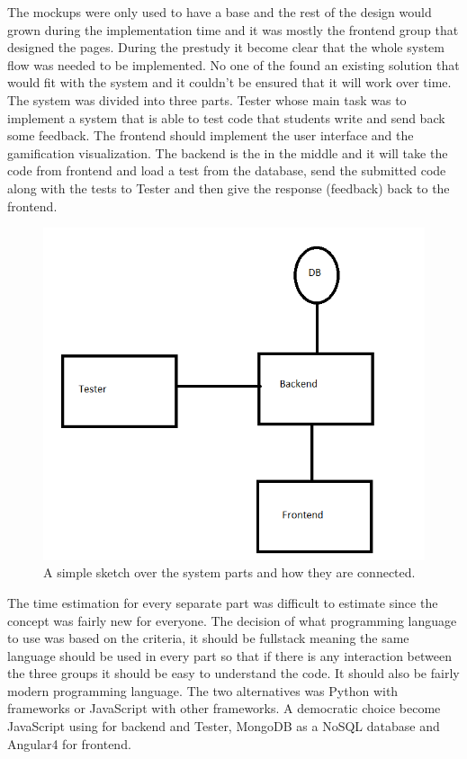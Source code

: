 The mockups were only used to have a base and the rest of the design would grown during the implementation time and it was mostly the frontend group that designed the pages. 
During the prestudy it become clear that the whole system flow was needed to be implemented. No one of the found an existing solution that would fit with the system and it couldn't be ensured that it will work over time. The system was divided into three parts. Tester whose main task was to implement a system that is able to test code that students write and send back some feedback. The frontend should implement the user interface and the gamification visualization. The backend is the in the middle and it will take the code from frontend and load a test from the database, send the submitted code along with the tests to Tester and then give the response (feedback) back to the frontend.

\begin{figure}[H]
\centering
\includegraphics[scale=0.8]{img/SystemA.png}
\caption{A simple sketch over the system parts and how they are connected.}
\end{figure}

The time estimation for every separate part was difficult to estimate since the concept was fairly new for everyone. The decision of what programming language to use was based on the criteria, it should be fullstack meaning the same language should be used in every part so that if there is any interaction between the three groups it should be easy to understand the code. It should also be fairly modern programming language. The two alternatives was Python with frameworks or JavaScript with other frameworks. A democratic choice become JavaScript using \nodejs{} for backend and Tester, MongoDB as a NoSQL database and Angular4 for frontend. 


